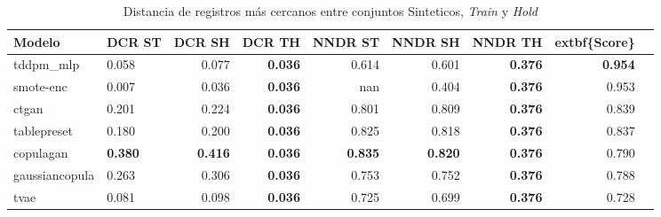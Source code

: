 \begin{table}[H]
\centering
\caption{Distancia de registros más cercanos entre conjuntos Sinteticos, \emph{Train} y \emph{Hold}}
\label{table-dcr-king county-a-3}
\begin{tabular}{|l|l|r|r|r|r|r|r|r|}
\hline
\rowcolor[gray]{0.8}
Modelo & DCR ST & DCR SH & DCR TH & NNDR ST & NNDR SH & NNDR TH & 	extbf\{Score\} \\
\hline tddpm\_mlp & 0.058 & 0.077 & \bfseries 0.036 & 0.614 & 0.601 & \bfseries 0.376 & \bfseries 0.954 \\
\hline smote-enc & \cellcolor{red} 0.007 & \cellcolor{red} 0.036 & \bfseries 0.036 & nan & 0.404 & \bfseries 0.376 & 0.953 \\
\hline ctgan & 0.201 & 0.224 & \bfseries 0.036 & 0.801 & 0.809 & \bfseries 0.376 & 0.839 \\
\hline tablepreset & 0.180 & 0.200 & \bfseries 0.036 & 0.825 & 0.818 & \bfseries 0.376 & 0.837 \\
\hline copulagan & \bfseries 0.380 & \bfseries 0.416 & \bfseries 0.036 & \bfseries 0.835 & \bfseries 0.820 & \bfseries 0.376 & 0.790 \\
\hline gaussiancopula & 0.263 & 0.306 & \bfseries 0.036 & 0.753 & 0.752 & \bfseries 0.376 & 0.788 \\
\hline tvae & 0.081 & 0.098 & \bfseries 0.036 & 0.725 & 0.699 & \bfseries 0.376 & 0.728 \\
\hline
\end{tabular}
\end{table}
